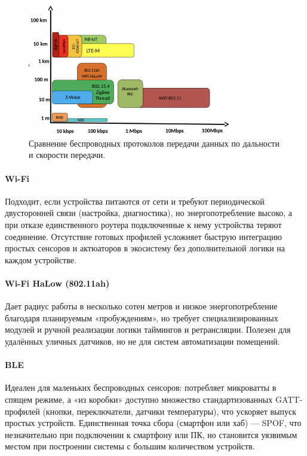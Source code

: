 \documentclass[14pt, a4paper]{extreport}
\begin{document}
\begin{figure}[ht]
    \centering
    \includegraphics[width=0.8\textwidth]{images/Fig07.png}
    \captionsetup{justification=centering}
    \caption{Сравнение беспроводных протоколов передачи данных по дальности и скорости передачи. \cite{IMG_protocol_compare} }
    \label{fig:protocols_range_vs_speed}
\end{figure}


\paragraph{Wi-Fi}
Подходит, если устройства питаются от сети и требуют периодической двусторонней связи (настройка, диагностика), но энергопотребление высоко, а при отказе единственного роутера подключенные к нему устройства теряют соединение. Отсутствие готовых профилей усложняет быструю интеграцию простых сенсоров и актюаторов в экосистему без дополнительной логики на каждом устройстве.

\paragraph{Wi-Fi HaLow (802.11ah)}
Дает радиус работы в несколько сотен метров и низкое энергопотребление благодаря планируемым «пробуждениям», но требует специализированных модулей и ручной реализации логики таймингов и ретрансляции. Полезен для удалённых уличных датчиков, но не для систем автоматизации помещений.

\paragraph{BLE}
Идеален для маленьких беспроводных сенсоров: потребляет микроватты в спящем режиме, а «из коробки» доступно множество стандартизованных GATT-профилей (кнопки, переключатели, датчики температуры), что ускоряет выпуск простых устройств. Единственная точка сбора (смартфон или хаб) — SPOF, что незначительно при подключении к смартфону или ПК, но становится уязвимым местом при построении системы с большим количеством устройств.
\end{document}

